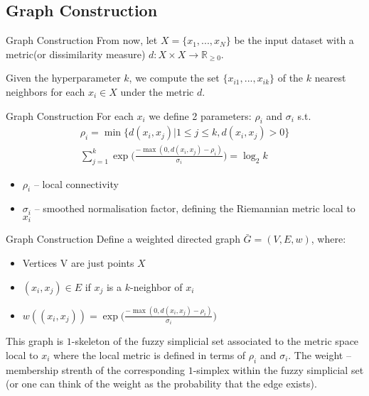 \documentclass{beamer}
\theoremstyle{named}
\begin{document}
\subsection{Graph Construction}

\begin{frame}{Graph Construction}
	From now, let $X = \{ x_1, ..., x_N \}$ be the input dataset with a metric(or dissimilarity measure) $d: X \times X \to \mathbb{R}_{\geq 0}$.
	
	Given the hyperparameter $k$, we compute the set $\{ x_{i1}, ..., x_{ik} \}$ of the $k$ nearest neighbors for each $x_i \in X$ under the metric $d$. 
\end{frame}


\begin{frame}[fragile]{Graph Construction}
	For each $x_i$ we define 2 parameters: $\rho_i$ and $\sigma_i$ s.t.
	\begin{align*}
	\rho_i = \min\{ d(x_i, x_j) | 1 \leq j \leq k, d(x_i, x_j) > 0 \} \\
	\sum\limits_{j=1}^k \exp\big( \frac{ -\max(0, d(x_i, x_j) - \rho_i) }{\sigma_i} \big) = \log_2k
	\end{align*}
	\begin{itemize}
		\item $\rho_i$ -- local connectivity
		\item $\sigma_i$ -- smoothed normalisation factor, defining the Riemannian metric local to $x_i$
	\end{itemize}
\end{frame}

\begin{frame}[fragile]{Graph Construction}
	Define a weighted directed graph $\bar{G} = (V,E,w)$, where:
	\begin{itemize}
		\item Vertices V are just points $X$
		\item $(x_i, x_j) \in E$ if $x_j$ is a $k$-neighbor of $x_i$
		\item $w((x_i, x_j)) = \exp\big( \frac{ -\max(0, d(x_i, x_j) - \rho_i) }{\sigma_i} \big)$
	\end{itemize}
	This graph is $1$-skeleton of the fuzzy simplicial set associated to the metric space local to $x_i$ where the local metric is defined in terms of $\rho_i$ and $\sigma_i$. The weight -- membership strenth of the corresponding $1$-simplex within the fuzzy simplicial set (or one can think of the weight as the probability that the edge exists).
\end{frame}
\end{document}
